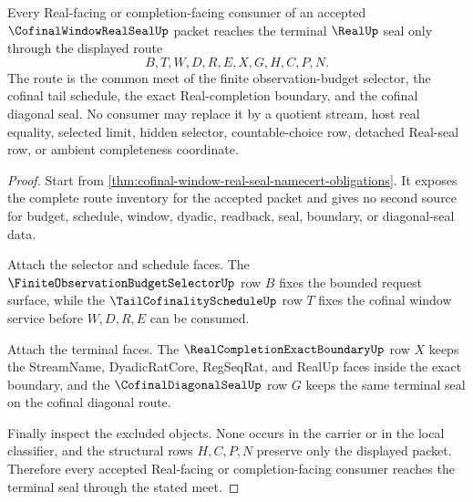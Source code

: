 \begin{theorem}
\label{thm:cofinal-window-real-seal-terminal-meet}
Every Real-facing or completion-facing consumer of an accepted $\CofinalWindowRealSealUp$ packet reaches the terminal $\RealUp$ seal only through the displayed route
$$
B,T,W,D,R,E,X,G,H,C,P,N.
$$
The route is the common meet of the finite observation-budget selector, the cofinal tail schedule, the exact Real-completion boundary, and the cofinal diagonal seal. No consumer may replace it by a quotient stream, host real equality, selected limit, hidden selector, countable-choice row, detached Real-seal row, or ambient completeness coordinate.
\end{theorem}
\begin{proof}
Start from \autoref{thm:cofinal-window-real-seal-namecert-obligations}. It exposes the complete route inventory for the accepted packet and gives no second source for budget, schedule, window, dyadic, readback, seal, boundary, or diagonal-seal data.

Attach the selector and schedule faces. The $\FiniteObservationBudgetSelectorUp$ row $B$ fixes the bounded request surface, while the $\TailCofinalityScheduleUp$ row $T$ fixes the cofinal window service before $W,D,R,E$ can be consumed.

Attach the terminal faces. The $\RealCompletionExactBoundaryUp$ row $X$ keeps the StreamName, DyadicRatCore, RegSeqRat, and RealUp faces inside the exact boundary, and the $\CofinalDiagonalSealUp$ row $G$ keeps the same terminal seal on the cofinal diagonal route.

Finally inspect the excluded objects. None occurs in the carrier or in the local classifier, and the structural rows $H,C,P,N$ preserve only the displayed packet. Therefore every accepted Real-facing or completion-facing consumer reaches the terminal seal through the stated meet.
\end{proof}

